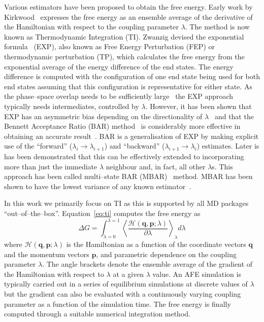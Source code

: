 \documentclass[journal=jctcce,manuscript=article]{achemso}
\renewcommand{\vec}[1]{\mathbf{#1}}
\begin{document}
Various estimators have been proposed to obtain the free energy.
Early work by Kirkwood~\cite{kirkwood_statistical_1935} expresses the
free energy as an ensemble average of the derivative of the
Hamiltonian with respect to the coupling parameter $\lambda$.  The
method is now known as Thermodynamic Integration (TI).  Zwanzig
devised the exponential formula~\cite{zwanzig_high-temperature_1954}
(EXP), also known as Free Energy Perturbation (FEP) or thermodynamic
perturbation (TP), which calculates the free energy from the
exponential average of the energy difference of the end states.  The
energy difference is computed with the configuration of one end state
being used for both end states assuming that this configuration is
representative for either state.  As the phase--space overlap needs to
be sufficiently large~\cite{wu_phase-space_2005,
  wu_phase-space_2005-1} the EXP approach typically needs
intermediates, controlled by $\lambda$.  However, it has been shown
that EXP has an asymmetric bias depending on the directionality of
$\lambda$~\cite{wu_asymmetric_2004} and that the Bennett Acceptance
Ratio (BAR) method~\cite{bennett_efficient_1976} is considerably more
effective in obtaining an accurate result~\cite{lu_appropriate_2003}.
BAR is a generalisation of EXP by making explicit use of the
``forward'' ($\lambda_i \rightarrow \lambda_{i+1}$) and ``backward''
($\lambda_{i+1} \rightarrow \lambda_i$) estimates.  Later is has been
demonstrated that this can be effectively extended to incorporating
more than just the immediate $\lambda$ neighbour and, in fact, all
other $\lambda$s.  This approach has been called multi--state BAR
(MBAR)~\cite{shirts_statistically_2008-1} method.  MBAR has been shown
to have the lowest variance of any known
estimator~\cite{shirts_statistically_2008}.

In this work we primarily focus on TI as this is supported by all MD
packages ``out--of--the--box''.  Equation~\ref{eq:ti} computes the free energy as
\begin{equation}\label{eq:ti}
	\Delta G = \int_{\lambda=0}^{\lambda=1}
	\left\langle \frac{\mathscr{H}(\vec{q},\vec{p};\lambda)}{\partial\lambda}\right\rangle_\lambda d\lambda
\end{equation}
where $\mathscr{H}(\vec{q},\vec{p};\lambda)$ is the Hamiltonian as a function of the coordinate vectors $\vec{q}$ and the momentum vectors $\vec{p}$, and parametric dependence on the coupling parameter $\lambda$.  The angle brackets denote the ensemble average of the gradient of the Hamiltonian with respect to $\lambda$ at a given $\lambda$ value.  An AFE simulation is typically carried out in a series of equilibrium simulations at discrete values of $\lambda$ but the gradient can also be evaluated with a continuously varying coupling parameter as a function of the simulation time.  The free energy is finally computed through a suitable numerical integration method.
\end{document}
